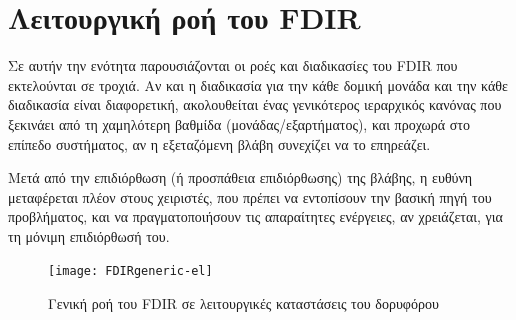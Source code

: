 \documentclass[a4paper,nobib]{tufte-book}
\begin{document}
\FloatBarrier
\section{Λειτουργική ροή του \acs{FDIR}}
\label{sec:fdir_operating_modes}

Σε αυτήν την ενότητα παρουσιάζονται οι ροές και διαδικασίες του \acs{FDIR} που εκτελούνται σε τροχιά. Αν και η διαδικασία για την κάθε δομική μονάδα και την κάθε διαδικασία είναι διαφορετική, ακολουθείται ένας γενικότερος ιεραρχικός κανόνας που ξεκινάει από τη χαμηλότερη βαθμίδα (μονάδας/εξαρτήματος), και προχωρά στο επίπεδο συστήματος, αν η εξεταζόμενη βλάβη συνεχίζει να το επηρεάζει.

Μετά από την επιδιόρθωση (ή προσπάθεια επιδιόρθωσης) της βλάβης, η ευθύνη μεταφέρεται πλέον στους χειριστές, που πρέπει να εντοπίσουν την βασική πηγή του προβλήματος, και να πραγματοποιήσουν τις απαραίτητες ενέργειες, αν χρειάζεται, για τη μόνιμη επιδιόρθωσή του.

\begin{figure}[h]
	\texttt{[image: FDIRgeneric-el]}
	\caption{Γενική ροή του \acs{FDIR} σε λειτουργικές καταστάσεις του δορυφόρου}
	\label{fig:generalflow}
\end{figure}
\end{document}
